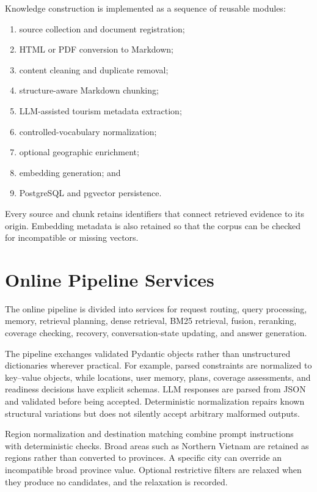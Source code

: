 Knowledge construction is implemented as a sequence of reusable modules:

\begin{enumerate}
    \item source collection and document registration;
    \item HTML or PDF conversion to Markdown;
    \item content cleaning and duplicate removal;
    \item structure-aware Markdown chunking;
    \item LLM-assisted tourism metadata extraction;
    \item controlled-vocabulary normalization;
    \item optional geographic enrichment;
    \item embedding generation; and
    \item PostgreSQL and pgvector persistence.
\end{enumerate}

Every source and chunk retains identifiers that connect retrieved evidence to
its origin. Embedding metadata is also retained so that the corpus can be
checked for incompatible or missing vectors.

\section{Online Pipeline Services}

The online pipeline is divided into services for request routing, query
processing, memory, retrieval planning, dense retrieval, BM25 retrieval,
fusion, reranking, coverage checking, recovery, conversation-state updating,
and answer generation.

The pipeline exchanges validated Pydantic objects rather than unstructured
dictionaries wherever practical. For example, parsed constraints are normalized
to key--value objects, while locations, user memory, plans, coverage assessments,
and readiness decisions have explicit schemas. LLM responses are parsed from
JSON and validated before being accepted. Deterministic normalization repairs
known structural variations but does not silently accept arbitrary malformed
outputs.

Region normalization and destination matching combine prompt instructions with
deterministic checks. Broad areas such as Northern Vietnam are retained as
regions rather than converted to provinces. A specific city can override an
incompatible broad province value. Optional restrictive filters are relaxed
when they produce no candidates, and the relaxation is recorded.

